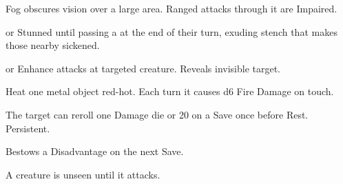 \documentclass[itdr]{subfiles}
\begin{document}
\begin{enumerate}
	\item {} Fog obscures vision over a large area. Ranged attacks through it are Impaired.
	\item {}  or Stunned until passing a   at the end of their turn, exuding stench that makes those nearby sickened.
	\item {}  or Enhance attacks at targeted creature. Reveals invisible target.
	\item {} Heat one metal object red-hot. Each turn it causes d6 Fire Damage on touch.
	\item {} The target can reroll one Damage die or 20 on a Save once before Rest. Persistent.
	\item {} Bestows a Disadvantage on the next Save.

	\begin{minipage}{\columnwidth}
	\item {} A creature is unseen until it attacks.
	\end{minipage}


\end{enumerate}
\end{document}
